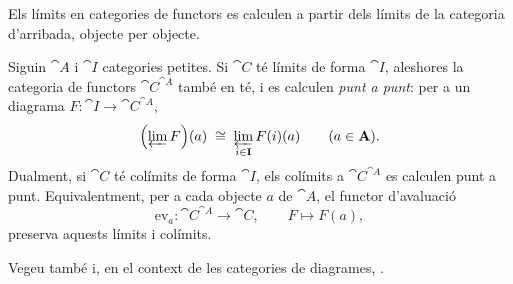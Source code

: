 Els límits en categories de functors es calculen a partir dels límits de la categoria d'arribada, objecte per objecte.

\begin{proposicio}\label{prop:limits-punt-a-punt}
Siguin $\cat{A}$ i $\cat{I}$ categories petites. Si $\cat{C}$ té límits de forma $\cat{I}$, aleshores la categoria de functors $\cat{C}^{\cat{A}}$ també en té, i es calculen \emph{punt a punt}: per a un diagrama $F\colon\cat{I}\to\cat{C}^{\cat{A}}$,
\[
\Bigl(\varprojlim F\Bigr)(a)\;\cong\;\varprojlim_{i\in\mathbf{I}}F(i)(a)
\qquad(a\in\mathbf{A}).
\]
Dualment, si $\cat{C}$ té colímits de forma $\cat{I}$, els colímits a $\cat{C}^{\cat{A}}$ es calculen punt a punt. Equivalentment, per a cada objecte $a$ de $\cat{A}$, el functor d'avaluació
\[
\mathrm{ev}_a\colon\cat{C}^{\cat{A}}\longrightarrow\cat{C},\qquad F\longmapsto F(a),
\]
preserva aquests límits i colímits.
\end{proposicio}
Vegeu també \cite[§3.3]{riehl} i, en el context de les categories de diagrames, \cite[§§8.5--8.6]{awodey}.

